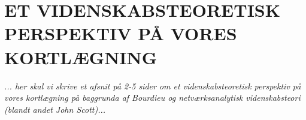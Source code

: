 








\section{ET VIDENSKABSTEORETISK PERSPEKTIV PÅ VORES KORTLÆGNING \label{}}

\emph{... her skal vi skrive et afsnit på 2-5 sider om et videnskabsteoretisk perspektiv på vores kortlægning på baggrunda af Bourdieu og netværksanalytisk videnskabsteori (blandt andet John Scott)...} %



